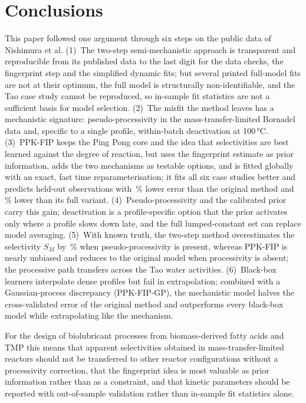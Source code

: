 \section{Conclusions}
This paper followed one argument through six steps on the public data of Nishimura et al. (1)~The two-step semi-mechanistic approach is transparent and reproducible from its published data to the last digit for the data checks, the fingerprint step and the simplified dynamic fits; but several printed full-model fits are not at their optimum, the full model is structurally non-identifiable, and the Tao case study cannot be reproduced, so in-sample fit statistics are not a sufficient basis for model selection. (2)~The misfit the method leaves has a mechanistic signature: pseudo-processivity in the mass-transfer-limited Bornadel data and, specific to a single profile, within-batch deactivation at 100\,°C. (3)~PPK-FIP keeps the Ping Pong core and the idea that selectivities are best learned against the degree of reaction, but uses the fingerprint estimate as prior information, adds the two mechanisms as testable options, and is fitted globally with an exact, fast time reparameterisation; it fits all six case studies better and predicts held-out observations with \LotoAllRedOrig\,\% lower error than the original method and \LotoAllRedFull\,\% lower than its full variant. (4)~Pseudo-processivity and the calibrated prior carry this gain; deactivation is a profile-specific option that the prior activates only where a profile slows down late, and the full lumped-constant set can replace model averaging. (5)~With known truth, the two-step method overestimates the selectivity $S_M$ by \SimSMBiasOrigPct\,\% when pseudo-processivity is present, whereas PPK-FIP is nearly unbiased and reduces to the original model when processivity is absent; the processive path transfers across the Tao water activities. (6)~Black-box learners interpolate dense profiles but fail in extrapolation; combined with a Gaussian-process discrepancy (PPK-FIP-GP), the mechanistic model halves the cross-validated error of the original method and outperforms every black-box model while extrapolating like the mechanism.

For the design of biolubricant processes from biomass-derived fatty acids and TMP this means that apparent selectivities obtained in mass-transfer-limited reactors should not be transferred to other reactor configurations without a processivity correction, that the fingerprint idea is most valuable as prior information rather than as a constraint, and that kinetic parameters should be reported with out-of-sample validation rather than in-sample fit statistics alone.
